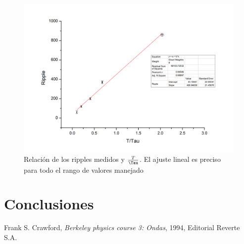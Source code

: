 \documentclass[11pt,a4paper]{article}
\begin{document}
\begin{figure}[H]
\centering
\includegraphics[scale=0.5]{completa_lineal}
   \caption{Relación de los ripples medidos y $\frac{T}{\Tau}$. El ajuste lineal es preciso para todo el rango de valores manejado}
   \label{fig:completa_lineal}
\end{figure}


\section{Conclusiones}
\label{sec:conclusiones}








\begin{thebibliography}{1}
  Frank S. Crawford, \textit{Berkeley physics course 3: Ondas}, 1994, Editorial Reverte S.A.
\end{thebibliography}
 
\end{document}
